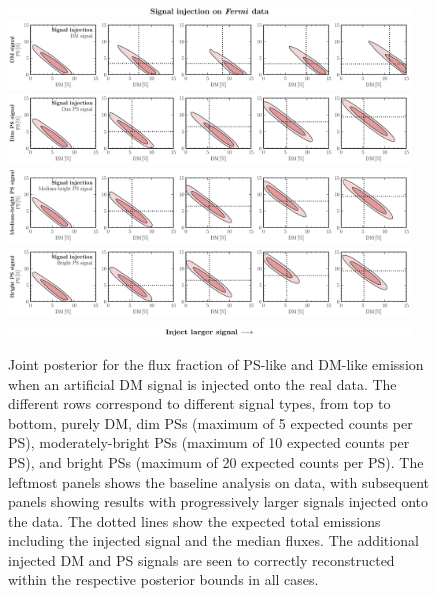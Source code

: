\documentclass[prd,aps,10pt,nofootinbib,twocolumn,superscriptaddress,preprintnumbers,balancelastpage,longbibliography,floatfix]{revtex4-2}
\begin{document}
%
\begin{figure}
\centering
\includegraphics[width=0.95\textwidth]{plots/sig_inj_title.pdf}
\includegraphics[width=0.95\textwidth]{plots/data_sig_inj_dm.pdf}
\includegraphics[width=0.95\textwidth]{plots/data_sig_inj_dim_ps.pdf}
\includegraphics[width=0.95\textwidth]{plots/data_sig_inj_med_ps.pdf}
\includegraphics[width=0.95\textwidth]{plots/data_sig_inj_ps.pdf}
\includegraphics[width=0.95\textwidth]{plots/sig_inj_chyron.pdf}
\caption{Joint posterior for the flux fraction of PS-like and DM-like emission when an artificial DM signal is injected onto the real \Fermi data. The different rows correspond to different signal types, from top to bottom, purely DM, dim PSs (maximum of 5 expected counts per PS), moderately-bright PSs (maximum of 10 expected counts per PS), and bright PSs (maximum of 20 expected counts per PS). The leftmost panels shows the baseline analysis on \Fermi data, with subsequent panels showing results with progressively larger signals injected onto the data. The dotted lines show the expected total emissions including the injected signal and the median fluxes. The additional injected DM and PS signals are seen to correctly reconstructed within the respective posterior bounds in all cases.}
\label{fig:sig_inj_data}
\end{figure}
%
\end{document}
